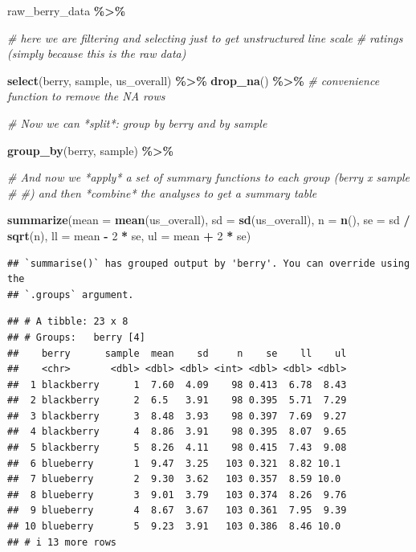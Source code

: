 \documentclass[
]{book}
\newenvironment{Shaded}{\begin{snugshade}}{\end{snugshade}}
\newcommand{\AttributeTok}[1]{\textcolor[rgb]{0.13,0.29,0.53}{#1}}
\newcommand{\CommentTok}[1]{\textcolor[rgb]{0.56,0.35,0.01}{\textit{#1}}}
\newcommand{\DecValTok}[1]{\textcolor[rgb]{0.00,0.00,0.81}{#1}}
\newcommand{\FunctionTok}[1]{\textcolor[rgb]{0.13,0.29,0.53}{\textbf{#1}}}
\newcommand{\NormalTok}[1]{#1}
\newcommand{\SpecialCharTok}[1]{\textcolor[rgb]{0.81,0.36,0.00}{\textbf{#1}}}
\begin{document}
\begin{Shaded}
\begin{Highlighting}[]
\NormalTok{raw\_berry\_data }\SpecialCharTok{\%\textgreater{}\%}
  
  \CommentTok{\# here we are filtering and selecting just to get unstructured line scale}
  \CommentTok{\# ratings (simply because this is the raw data)}
  
  \FunctionTok{select}\NormalTok{(berry, sample, us\_overall) }\SpecialCharTok{\%\textgreater{}\%}
  \FunctionTok{drop\_na}\NormalTok{() }\SpecialCharTok{\%\textgreater{}\%} \CommentTok{\# convenience function to remove the NA rows}

  \CommentTok{\# Now we can *split*: group by berry and by sample }
  
  \FunctionTok{group\_by}\NormalTok{(berry, sample) }\SpecialCharTok{\%\textgreater{}\%}
  
  \CommentTok{\# And now we *apply* a set of summary functions to each group (berry x sample}
  \CommentTok{\# \#) and then *combine* the analyses to get a summary table}
  
  \FunctionTok{summarize}\NormalTok{(}\AttributeTok{mean =} \FunctionTok{mean}\NormalTok{(us\_overall),}
            \AttributeTok{sd =} \FunctionTok{sd}\NormalTok{(us\_overall),}
            \AttributeTok{n =} \FunctionTok{n}\NormalTok{(),}
            \AttributeTok{se =}\NormalTok{ sd }\SpecialCharTok{/} \FunctionTok{sqrt}\NormalTok{(n),}
            \AttributeTok{ll =}\NormalTok{ mean }\SpecialCharTok{{-}} \DecValTok{2} \SpecialCharTok{*}\NormalTok{ se,}
            \AttributeTok{ul =}\NormalTok{ mean }\SpecialCharTok{+} \DecValTok{2} \SpecialCharTok{*}\NormalTok{ se)}
\end{Highlighting}
\end{Shaded}

\begin{verbatim}
## `summarise()` has grouped output by 'berry'. You can override using the
## `.groups` argument.
\end{verbatim}

\begin{verbatim}
## # A tibble: 23 x 8
## # Groups:   berry [4]
##    berry      sample  mean    sd     n    se    ll    ul
##    <chr>       <dbl> <dbl> <dbl> <int> <dbl> <dbl> <dbl>
##  1 blackberry      1  7.60  4.09    98 0.413  6.78  8.43
##  2 blackberry      2  6.5   3.91    98 0.395  5.71  7.29
##  3 blackberry      3  8.48  3.93    98 0.397  7.69  9.27
##  4 blackberry      4  8.86  3.91    98 0.395  8.07  9.65
##  5 blackberry      5  8.26  4.11    98 0.415  7.43  9.08
##  6 blueberry       1  9.47  3.25   103 0.321  8.82 10.1 
##  7 blueberry       2  9.30  3.62   103 0.357  8.59 10.0 
##  8 blueberry       3  9.01  3.79   103 0.374  8.26  9.76
##  9 blueberry       4  8.67  3.67   103 0.361  7.95  9.39
## 10 blueberry       5  9.23  3.91   103 0.386  8.46 10.0 
## # i 13 more rows
\end{verbatim}
\end{document}

